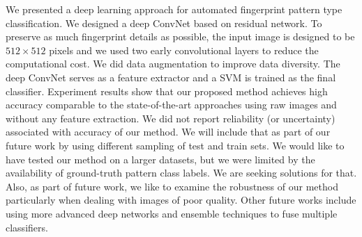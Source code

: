
We presented a deep learning approach for automated fingerprint pattern type classification. We designed a deep ConvNet based on residual network. To preserve as much fingerprint details as possible, the input image  is designed to be  $512\times512$ pixels and we used two early convolutional layers to reduce the computational cost.  We did data augmentation to improve data diversity.  The deep ConvNet serves as a feature extractor and a SVM is trained as the final classifier. Experiment results show that our proposed method achieves high accuracy comparable to the state-of-the-art approaches using raw images and without any feature extraction.  We did not report reliability (or uncertainty) associated with accuracy of our method.  We will include that as part of our future work by using different sampling of test and train sets.  We would like to have tested our method on a larger datasets, but we were limited by the availability of ground-truth pattern class labels.  We are seeking solutions for that.  Also, as part of future work, we like to examine the robustness of our method particularly when dealing with images of poor quality.
Other future works include using more advanced deep networks and ensemble techniques to fuse multiple classifiers.